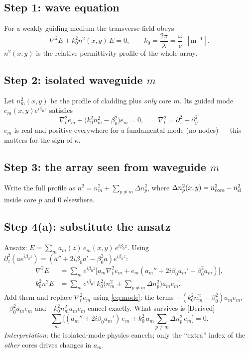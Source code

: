 \documentclass[10pt,a4paper]{article}
\newcommand{\evd}[1]{\textsf{\small[#1]}}
\begin{document}
\subsection{Step 1: wave equation}
For a weakly guiding medium the transverse field obeys
\begin{equation}
\nabla^2E+k_0^2n^2(x,y)\,E=0,\qquad k_0=\frac{2\pi}{\lambda}=\frac{\omega}{c}\ \ [\mathrm{m^{-1}}].\label{eq:helm}
\end{equation}
$n^2(x,y)$ is the relative permittivity profile of the whole array.

\subsection{Step 2: isolated waveguide $m$}
Let $n_m^2(x,y)$ be the profile of cladding plus \emph{only} core $m$. Its guided mode $e_m(x,y)e^{i\beta_0 z}$ satisfies
\begin{equation}
\nabla_t^2e_m+\big(k_0^2n_m^2-\beta_0^2\big)e_m=0,\qquad \nabla_t^2=\partial_x^2+\partial_y^2 .\label{eq:mode}
\end{equation}
$e_m$ is real and positive everywhere for a fundamental mode (no nodes) --- this matters for the sign of $\kappa$.

\subsection{Step 3: the array seen from waveguide $m$}
Write the full profile as $n^2=n_m^2+\sum_{p\neq m}\Delta n_p^2$, where $\Delta n_p^2(x,y)=n_{\rm core}^2-n_{\rm cl}^2$ inside core $p$ and $0$ elsewhere.

\subsection{Step 4(a): substitute the ansatz}
Ansatz: $E=\sum_m a_m(z)\,e_m(x,y)\,e^{i\beta_0z}$. Using $\partial_z^2(a e^{i\beta_0z})=(a''+2i\beta_0a'-\beta_0^2a)e^{i\beta_0z}$:
\begin{align*}
\nabla^2E&=\textstyle\sum_m e^{i\beta_0z}\big[a_m\nabla_t^2e_m+e_m(a_m''+2i\beta_0a_m'-\beta_0^2a_m)\big],\\
k_0^2n^2E&=\textstyle\sum_m e^{i\beta_0z}\,k_0^2\big(n_m^2+\sum_{p\neq m}\Delta n_p^2\big)a_me_m .
\end{align*}
Add them and replace $\nabla_t^2e_m$ using \eqref{eq:mode}: the terms $-(k_0^2n_m^2-\beta_0^2)a_me_m$, $-\beta_0^2a_me_m$ and $+k_0^2n_m^2a_me_m$ cancel exactly. What survives is \evd{Derived}
\begin{equation}
\sum_m\Big[(a_m''+2i\beta_0a_m')\,e_m+k_0^2\,a_m\sum_{p\neq m}\Delta n_p^2\,e_m\Big]=0. \label{eq:4a}
\end{equation}
\emph{Interpretation:} the isolated-mode physics cancels; only the ``extra'' index of the \emph{other} cores drives changes in $a_m$.
\end{document}

